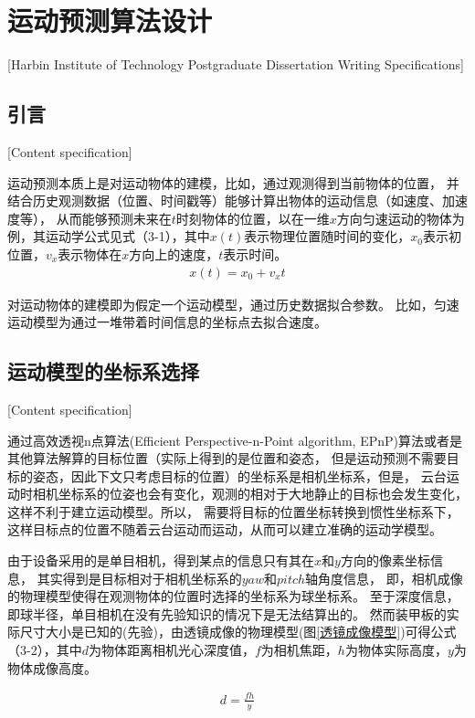 


\chapter[运动预测算法设计]{运动预测算法设计}[Harbin Institute of Technology Postgraduate Dissertation Writing Specifications]


\section{引言}[Content specification]

运动预测本质上是对运动物体的建模，比如，通过观测得到当前物体的位置，
并结合历史观测数据（位置、时间戳等）能够计算出物体的运动信息（如速度、加速度等），
从而能够预测未来在$t$时刻物体的位置，以在一维$x$方向匀速运动的物体为例，其运动学公式见式（3-1），其中$x(t)$表示物理位置随时间的变化，$x_0$表示初位置，$v_x$表示物体在$x$方向上的速度，$t$表示时间。
\begin{gather}
    x(t) = x_0 + v_xt \label{linear_model}
\end{gather}

对运动物体的建模即为假定一个运动模型，通过历史数据拟合参数。
比如，匀速运动模型为通过一堆带着时间信息的坐标点去拟合速度。




\section{运动模型的坐标系选择}[Content specification]

通过高效透视n点算法(Efficient Perspective-n-Point algorithm, EPnP)算法或者是其他算法解算的目标位置（实际上得到的是位置和姿态，
但是运动预测不需要目标的姿态，因此下文只考虑目标的位置）的坐标系是相机坐标系，但是，
云台运动时相机坐标系的位姿也会有变化，观测的相对于大地静止的目标也会发生变化，这样不利于建立运动模型。所以，
需要将目标的位置坐标转换到惯性坐标系下，这样目标点的位置不随着云台运动而运动，从而可以建立准确的运动学模型。\par
由于设备采用的是单目相机，得到某点的信息只有其在$x$和$y$方向的像素坐标信息，
其实得到是目标相对于相机坐标系的$yaw$和$pitch$轴角度信息，
即，相机成像的物理模型使得在观测物体的位置时选择的坐标系为球坐标系。
至于深度信息，即球半径，单目相机在没有先验知识的情况下是无法结算出的。
然而装甲板的实际尺寸大小是已知的(先验)，由透镜成像的物理模型(图\ref{透镜成像模型})可得公式（3-2），其中$d$为物体距离相机光心深度值，$f$为相机焦距，$h$为物体实际高度，$y$为物体成像高度。\par
\begin{gather}
    d = \frac{fh}{y} 
\end{gather}

